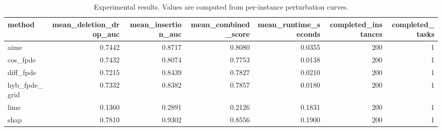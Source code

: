 \begin{table}[t]
\caption{Experimental results. Values are computed from per-instance perturbation curves.}
\label{tab:main_results_computed}
\centering
\begin{tabular}{lrrrrrr}
\toprule
method & mean\_deletion\_drop\_auc & mean\_insertion\_auc & mean\_combined\_score & mean\_runtime\_seconds & completed\_instances & completed\_tasks \\
\midrule
aime & 0.7442 & 0.8717 & 0.8080 & 0.0355 & 200 & 1 \\
cos\_fpde & 0.7432 & 0.8074 & 0.7753 & 0.0138 & 200 & 1 \\
diff\_fpde & 0.7215 & 0.8439 & 0.7827 & 0.0210 & 200 & 1 \\
hyb\_fpde\_grid & 0.7332 & 0.8382 & 0.7857 & 0.0180 & 200 & 1 \\
lime & 0.1360 & 0.2891 & 0.2126 & 0.1831 & 200 & 1 \\
shap & 0.7810 & 0.9302 & 0.8556 & 0.1900 & 200 & 1 \\
\bottomrule
\end{tabular}

\end{table}
